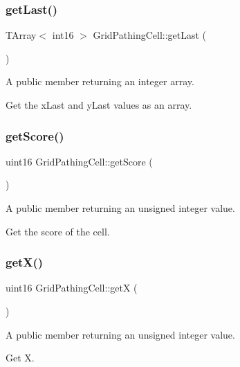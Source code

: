 \subsubsection{\texorpdfstring{get\+Last()}{getLast()}}
{\footnotesize\ttfamily T\+Array$<$ int16 $>$ Grid\+Pathing\+Cell\+::get\+Last (\begin{DoxyParamCaption}{ }\end{DoxyParamCaption})}



A public member returning an integer array. 

Get the x\+Last and y\+Last values as an array. \hypertarget{class_grid_pathing_cell_afa21d615e383d1f01664590903d71f8f}{}\label{class_grid_pathing_cell_afa21d615e383d1f01664590903d71f8f} 
\subsubsection{\texorpdfstring{get\+Score()}{getScore()}}
{\footnotesize\ttfamily uint16 Grid\+Pathing\+Cell\+::get\+Score (\begin{DoxyParamCaption}{ }\end{DoxyParamCaption})}



A public member returning an unsigned integer value. 

Get the score of the cell. \hypertarget{class_grid_pathing_cell_aa4d5642ce2427123298c94b49ba7967a}{}\label{class_grid_pathing_cell_aa4d5642ce2427123298c94b49ba7967a} 
\subsubsection{\texorpdfstring{get\+X()}{getX()}}
{\footnotesize\ttfamily uint16 Grid\+Pathing\+Cell\+::getX (\begin{DoxyParamCaption}{ }\end{DoxyParamCaption})}



A public member returning an unsigned integer value. 

Get X. \hypertarget{class_grid_pathing_cell_af1690d5798fb128d6bbf850375402ce1}{}\label{class_grid_pathing_cell_af1690d5798fb128d6bbf850375402ce1} 
